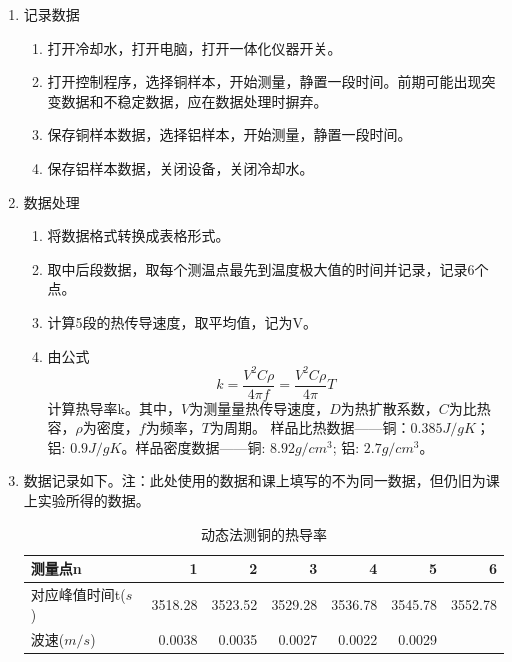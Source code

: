 \documentclass[11pt]{article}
\begin{document}
\begin{enumerate}
    \item 记录数据
    \begin{enumerate}
        \item 打开冷却水，打开电脑，打开一体化仪器开关。
        \item 打开控制程序，选择铜样本，开始测量，静置一段时间。前期可能出现突变数据和不稳定数据，应在数据处理时摒弃。
        \item 保存铜样本数据，选择铝样本，开始测量，静置一段时间。
        \item 保存铝样本数据，关闭设备，关闭冷却水。
    \end{enumerate}
    \item 数据处理
    \begin{enumerate}
        \item 将数据格式转换成表格形式。
        \item 取中后段数据，取每个测温点最先到温度极大值的时间并记录，记录6个点。
        \item 计算5段的热传导速度，取平均值，记为V。
        \item 由公式
        \[
            k=\frac{V^{2}C\rho }{4\pi f}=\frac{V^{2}C\rho }{4\pi }T
        \]
        计算热导率k。其中，$V$为测量量热传导速度，$D$为热扩散系数，$C$为比热容，$\rho$为密度，$f$为频率，$T$为周期。
        \newline 样品比热数据——铜：$0.385J/gK$；铝: $0.9J/gK$。样品密度数据——铜: $8.92g/cm^{3}$; 铝: $2.7g/cm^{3}$。
        
    \end{enumerate}
    \item 数据记录如下。注：此处使用的数据和课上填写的不为同一数据，但仍旧为课上实验所得的数据。  
        \begin{table}[H]
            \centering
            \caption{动态法测铜的热导率}
            \begin{center}
                \begin{tabular}{|l|r|r|r|r|r|r|}\hline 
                    测量点n  & 1     & 2     & 3     & 4     & 5     & 6 \\\hline
                    对应峰值时间t($s$) & 3518.28 & 3523.52 & 3529.28 & 3536.78 & 3545.78 & 3552.78 \\\hline
                    波速($m/s$) & 0.0038 & 0.0035 & 0.0027 & 0.0022 & 0.0029 &  \\\hline
                \end{tabular}%
                

\end{center}
\end{table}
\end{enumerate}
\end{document}
